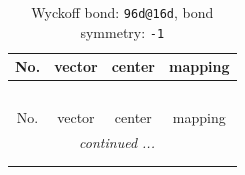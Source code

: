 \documentclass[fleqn,8pt]{jsarticle}
\begin{document}
\renewcommand{\arraystretch}{1.2}
\begin{longtable}{cccc}
\caption{Wyckoff bond: {\tt 96d@16d}, bond symmetry: {\tt -1}}
 \\
 \hline \hline
No. & vector & center & mapping \\ \hline \endfirsthead

\multicolumn{3}{l}{\tablename\ \thetable{}} \\
 \hline \hline
No. & vector & center & mapping \\ \hline \endhead

 \hline \hline
\multicolumn{3}{r}{\footnotesize\it continued ...} \\ \endfoot

 \hline \hline
\multicolumn{3}{r}{} \\ \endlastfoot


\end{longtable}
\end{document}
